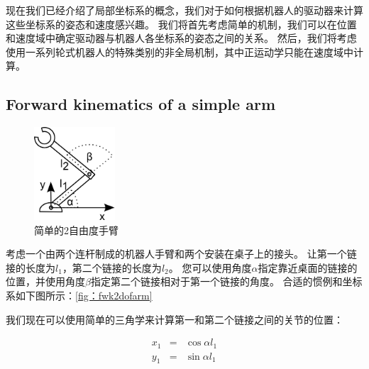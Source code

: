 现在我们已经介绍了局部坐标系的概念，我们对于如何根据机器人的驱动器来计算这些坐标系的姿态和速度感兴趣。 我们将首先考虑简单的机制，我们可以在位置和速度域中确定驱动器与机器人各坐标系的姿态之间的关系。 然后，我们将考虑使用一系列轮式机器人的特殊类别的非全局机制，其中正运动学只能在速度域中计算。

\subsection{Forward kinematics of a simple arm}
\begin{figure}[!htb]%
  \begin{center}
    \includegraphics[width=0.27\textwidth]{figs/fwk2dofarm}
  \end{center}
  \caption{简单的2自由度手臂}
  \label{fig:fwk2dofarm}
\end{figure}


考虑一个由两个连杆制成的机器人手臂和两个安装在桌子上的接头。 让第一个链接的长度为$ l_1 $，第二个链接的长度为$ l_2 $。 您可以使用角度$ \alpha $指定靠近桌面的链接的位置，并使用角度$ \beta $指定第二个链接相对于第一个链接的角度。 合适的惯例和坐标系如下图所示：\ref {fig：fwk2dofarm}


我们现在可以使用简单的三角学来计算第一和第二个链接之间的关节的位置：

\begin{eqnarray}\label{eq:cosxl1}
x_1 &=&\cos \alpha l_1\\
y_1 &=&\sin \alpha l_1
\end{eqnarray}

